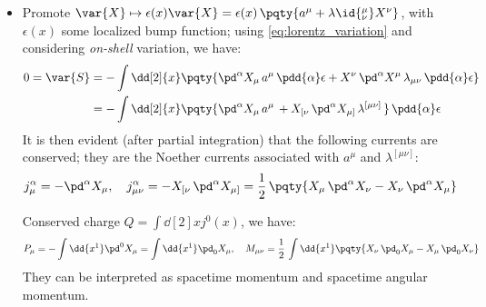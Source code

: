 \documentclass[a4paper,10pt]{article}
\begin{document}
\begin{itemize}
	\item Promote $
		\var{X}\mapsto \epsilon(x)\var{X}
		= \epsilon(x)\,\pqty{
			a^\mu + \lambda\id{^\mu_\nu} X^\nu
		}
	$, with $\epsilon(x)$ some localized bump function; using \eqref{eq:lorentz_variation} and considering \textit{on-shell} variation, we have:
	\begin{equation}
	\begin{aligned}
		0 = \var{S}
		&= - \int \dd[2]{x} \pqty{
			\pd^\alpha X_\mu\,
				a^\mu\,
				\pdd{\alpha}\epsilon
			+ X^\nu\,\pd^\alpha X^\mu\,
				\lambda_{\mu\nu}\,
				\pdd{\alpha}\epsilon
		} \\
		&= - \int \dd[2]{x} \pqty{
			\pd^\alpha X_\mu\,
				a^\mu\,
			+ X_{[\nu}\,\pd^\alpha X_{\mu]}\,
				\lambda^{[\mu\nu]}\,
		}\,\pdd{\alpha}\epsilon
	\end{aligned}
	\end{equation}
	It is then evident (after partial integration) that the following currents are conserved; they are the Noether currents associated with $a^\mu$ and $\lambda^{[\mu\nu]}$:
	\begin{equation}
		j^\alpha_\mu
		= -\pd^\alpha X_\mu,\quad
		j^\alpha_{\mu\nu}
		= -X_{[\nu}\,\pd^\alpha X_{\mu]}
		= \frac{1}{2}\,\pqty{
			X_\mu\,\pd^\alpha X_\nu
			- X_\nu\,\pd^\alpha X_\mu
		}
	\end{equation}
	
	Conserved charge $
		Q = \int\dd[2]{x} j^0(x)
	$, we have:
	\begin{equation}
		P_\mu = - \int\dd{x^1} \pd^0 X_\mu
		= \int\dd{x^1} \pd_0 X_\mu,\quad
		M_{\mu\nu}
		= \frac{1}{2}\,\int\dd{x^1}\pqty{
			X_\nu\,\pd_0 X_\mu
			- X_\mu\,\pd_0 X_\nu
		}
	\end{equation}
	They can be interpreted as spacetime momentum and spacetime angular momentum. 
	\qedfull
	\end{itemize}
\end{document}
